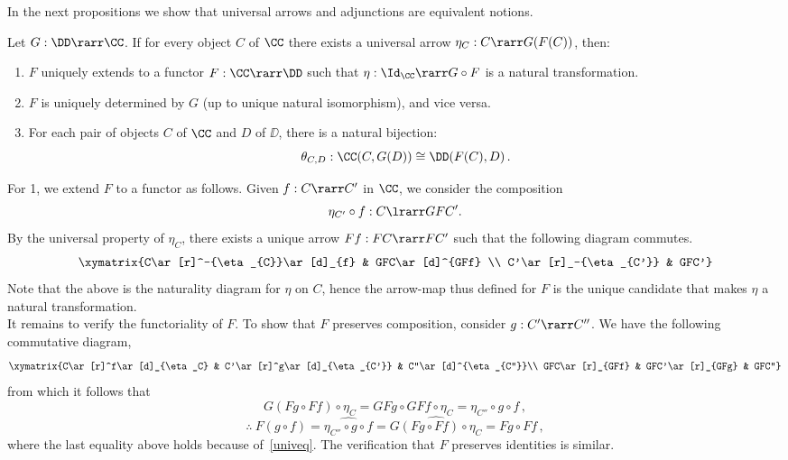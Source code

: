 \documentclass[12pt]{article}
\begin{document}
In the next propositions we show that universal arrows and adjunctions are equivalent notions.

\begin{myproposition}\label{p:UnivtoAdj}
Let $G:\DD\rarr\CC$. If for every object $C$ of $\CC$ there exists a universal arrow $\eta_{C} : C \rarr G(F(C))$, then:
\begin{enumerate}\renewcommand{\theenumi}{\rm\arabic{enumi}}
\item $F$ uniquely extends to a functor $F:\CC\rarr\DD$ such that $\eta : \Id_{\CC} \rarr G \circ F$ is a natural transformation.
\item $F$ is uniquely determined by $G$ (up to unique natural isomorphism), and vice versa.
\item For each pair of objects $C$ of $\CC$ and $D$ of $\DD$, there is a natural bijection:
\[ \theta_{C,D} : \CC(C, G(D))\cong\DD(F(C), D) \,. \]
\end{enumerate}
\end{myproposition}
\proof %
For 1, we extend $F$ to a functor as follows. Given $f : C \rarr C'$ in $\CC$, we consider the composition
\[ \eta_{C'} \circ f : C \lrarr GFC' . \]
By the universal property of $\eta_{C}$, there exists a unique arrow $Ff : FC \rarr FC'$ such that the following diagram commutes.
\[
\xymatrix{C\ar[r]^-{\eta_{C}}\ar[d]_{f} & GFC\ar[d]^{GFf} \\  C'\ar[r]_-{\eta_{C'}} & GFC'}
\]
Note that the above is the naturality diagram for $\eta$ on $C$, hence the arrow-map thus defined for $F$ is the unique candidate that makes
$\eta$ a natural transformation.
\\
It remains to verify the functoriality of $F$. To show that $F$ preserves composition, consider $g : C' \rarr C''$. We have the following commutative
diagram,
\[
\xymatrix{C\ar[r]^f\ar[d]_{\eta_C} & C'\ar[r]^g\ar[d]_{\eta_{C'}} & C''\ar[d]^{\eta_{C''}}\\ GFC\ar[r]_{GFf} & GFC'\ar[r]_{GFg} & GFC''}
\]
from which it follows that
\[ G(Fg \circ Ff) \circ \eta_{C} = GFg \circ GFf \circ \eta_{C} = \eta_{C''} \circ g \circ f\,, \]
\[\therefore\ F(g\circ f)=\widehat{\eta_{C''}\circ g\circ f}=\widehat{G(Fg\circ Ff)\circ\eta_C}=Fg\circ Ff\,, \]
where the last equality above holds because of~\eqref{univeq}. The verification that $F$ preserves identities is similar.
\end{document}
